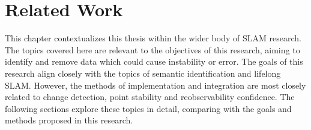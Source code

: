 \section{Related Work}
\label{sec:related_work}

This chapter contextualizes this thesis within the wider body of SLAM research. The topics covered here are relevant to the objectives of this research, aiming to identify and remove data which could cause instability or error. The goals of this research align closely with the topics of semantic identification and lifelong SLAM. However, the methods of implementation and integration are most closely related to change detection, point stability and reobservability confidence. The following sections explore these topics in detail, comparing with the goals and methods proposed in this research.

% 